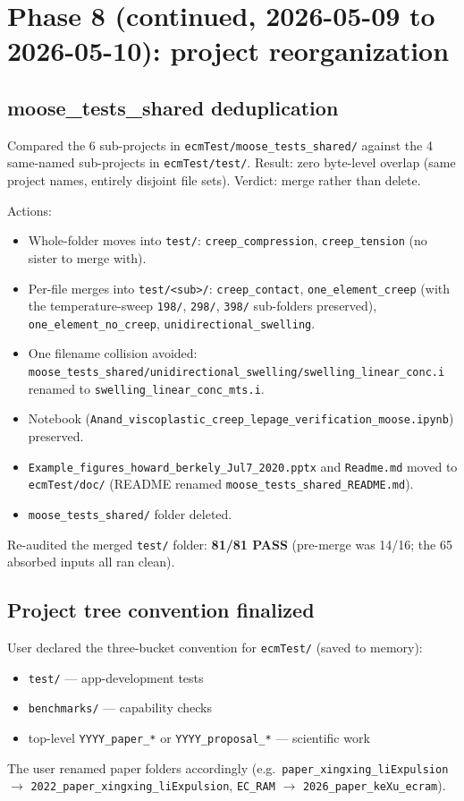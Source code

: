 \documentclass[11pt,letterpaper]{article}
\newenvironment{tightitemize}{\begin{itemize}\setlength\itemsep{0pt}\setlength\parsep{0pt}}{\end{itemize}}
\newcommand{\code}[1]{\texttt{\small #1}}
\begin{document}
\section{Phase 8 (continued, 2026-05-09 to 2026-05-10): project reorganization}

\subsection{moose\_tests\_shared deduplication}
Compared the 6 sub-projects in \code{ecmTest/moose\_tests\_shared/} against the 4 same-named sub-projects in \code{ecmTest/test/}. Result: zero byte-level overlap (same project names, entirely disjoint file sets). Verdict: merge rather than delete.

Actions:
\begin{tightitemize}
  \item Whole-folder moves into \code{test/}: \code{creep\_compression}, \code{creep\_tension} (no sister to merge with).
  \item Per-file merges into \code{test/<sub>/}: \code{creep\_contact}, \code{one\_element\_creep} (with the temperature-sweep \code{198/}, \code{298/}, \code{398/} sub-folders preserved), \code{one\_element\_no\_creep}, \code{unidirectional\_swelling}.
  \item One filename collision avoided: \code{moose\_tests\_shared/unidirectional\_swelling/swelling\_linear\_conc.i} renamed to \code{swelling\_linear\_conc\_mts.i}.
  \item Notebook (\code{Anand\_viscoplastic\_creep\_lepage\_verification\_moose.ipynb}) preserved.
  \item \code{Example\_figures\_howard\_berkely\_Jul7\_2020.pptx} and \code{Readme.md} moved to \code{ecmTest/doc/} (README renamed \code{moose\_tests\_shared\_README.md}).
  \item \code{moose\_tests\_shared/} folder deleted.
\end{tightitemize}

Re-audited the merged \code{test/} folder: \textbf{81/81 PASS} (pre-merge was 14/16; the 65 absorbed inputs all ran clean).

\subsection{Project tree convention finalized}
User declared the three-bucket convention for \code{ecmTest/} (saved to memory):
\begin{tightitemize}
  \item \code{test/} --- app-development tests
  \item \code{benchmarks/} --- capability checks
  \item top-level \code{YYYY\_paper\_*} or \code{YYYY\_proposal\_*} --- scientific work
\end{tightitemize}
The user renamed paper folders accordingly (e.g.\ \code{paper\_xingxing\_liExpulsion} $\to$ \code{2022\_paper\_xingxing\_liExpulsion}, \code{EC\_RAM} $\to$ \code{2026\_paper\_keXu\_ecram}).
\end{document}
